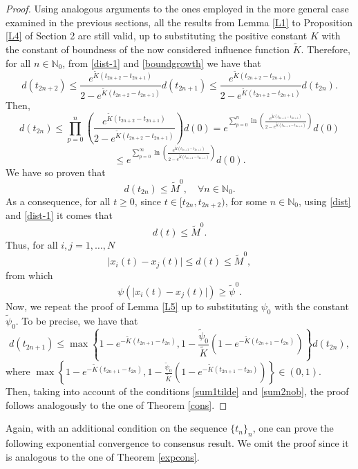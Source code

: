 \documentclass[a4paper,11pt,oneside]{article}
\begin{document}
\begin{proof}
	Using analogous arguments to the ones employed in the more general case examined in the previous sections, all the results from Lemma \ref{L1} to Proposition \ref{L4} of Section 2 are still valid, up to substituting the positive constant $K$ with the constant of boundness of the now considered influence function $\tilde{K}$. Therefore, for all $n\in \mathbb{N}_{0}$, from \eqref{dist-1} and \eqref{boundgrowth} we have that
	$$d(t_{2n+2})\leq \frac{e^{\tilde K(t_{2n+2}-t_{2n+1})}}{2-e^{\tilde K(t_{2n+2}-t_{2n+1})}}d(t_{2n+1})\leq \frac{e^{\tilde K(t_{2n+2}-t_{2n+1})}}{2-e^{\tilde K(t_{2n+2}-t_{2n+1})}}d(t_{2n}).$$
	Then, $$d(t_{2n})\leq \prod_{p=0}^{n}\left(\frac{e^{\tilde K(t_{2n+2}-t_{2n+1})}}{2-e^{\tilde K(t_{2n+2}-t_{2n+1})}}\right)d(0)=e^{\sum_{p=0}^{n}\ln \left(\frac{e^{\tilde K(t_{2n+2}-t_{2n+1})}}{2-e^{\tilde K(t_{2n+2}-t_{2n+1})}}\right)}d(0)$$$$\leq e^{\sum_{p=0}^{\infty}\ln \left(\frac{e^{\tilde K(t_{2n+2}-t_{2n+1})}}{2-e^{\tilde K(t_{2n+2}-t_{2n+1})}}\right)}d(0).$$
	We have so proven that
	\begin{equation}
		d(t_{2n})\leq \tilde M^{0},\quad \forall n \in \mathbb{N}_{0}.
	\end{equation}
	As a consequence, for all $t\geq 0$, since $t\in [t_{2n},t_{2n+2})$, for some $n\in \mathbb{N}_{0}$, using \eqref{dist} and \eqref{dist-1} it comes that 
	$$d(t)\leq \tilde M^{0}.$$
	Thus, for all $i,j=1,\dots,N$
	$$\lvert x_{i}(t)-x_{j}(t)\rvert\leq d(t)\leq \tilde M^{0},$$
	from which
	\begin{equation}
		\psi(\lvert x_{i}(t)-x_{j}(t)\rvert)\geq \tilde{\psi}^{0}.
	\end{equation}
Now, we repeat the proof of Lemma \ref{L5} up to substituting $\psi_{0}$ with the constant $\tilde{\psi}_{0}$. To be precise, we have that
$$d(t_{2n+1})\leq \max\left\{1-e^{-\tilde K(t_{2n+1}-t_{2n})},1-\frac{\tilde{\psi}_{0}}{\tilde K}(1-e^{-\tilde K(t_{2n+1}-t_{2n})})\right\}d(t_{2n}),$$
where $\max\left\{1-e^{-\tilde K(t_{2n+1}-t_{2n})},1-\frac{\tilde{\psi}_{0}}{\tilde K}(1-e^{-\tilde K(t_{2n+1}-t_{2n})})\right\}\in (0,1)$.
\\Then, taking into account of the conditions \eqref{sum1tilde} and \eqref{sum2nob}, the proof follows analogously to the one of Theorem \ref{cons}.
\end{proof}
Again, with an additional condition on the sequence $\{t_{n}\}_{n}$, one can prove the following exponential convergence to consensus result. We omit the proof since it is analogous to the one of Theorem \ref{expcons}.
\end{document}
